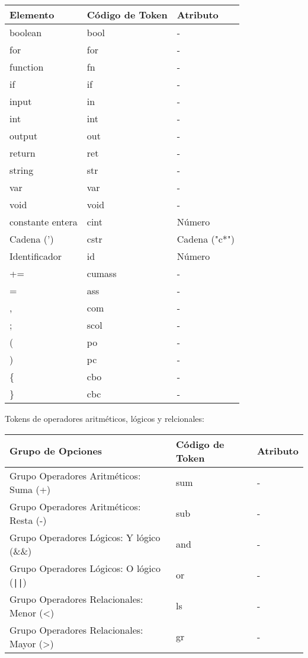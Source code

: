 \documentclass{article}
\begin{document}
\begin{table}[h!]
    \centering
    \begin{tabular}{|l|l|l|}
        \hline
        \textbf{Elemento} & \textbf{Código de Token} & \textbf{Atributo} \\ \hline
        boolean & bool & - \\ \hline
        for & for & - \\ \hline
        function & fn & - \\ \hline
        if & if & - \\ \hline
        input & in & - \\ \hline
        int & int & - \\ \hline
        output & out & - \\ \hline
        return & ret & - \\ \hline
        string & str & - \\ \hline
        var & var & - \\ \hline
        void & void & - \\ \hline
        constante entera & cint & Número \\ \hline
        Cadena (') & cstr & Cadena ("c*") \\ \hline
        Identificador & id & Número \\ \hline
        += & cumass & - \\ \hline
        = & ass & - \\ \hline
        , & com & - \\ \hline
        ; & scol & - \\ \hline
        ( & po & - \\ \hline
        ) & pc & - \\ \hline
        \{ & cbo & - \\ \hline
        \} & cbc & - \\ \hline
    \end{tabular}
\end{table}

Tokens de operadores aritméticos, lógicos y relcionales:
\begin{table}[h!]
    \centering
    \begin{tabular}{|l|l|l|}
        \hline
        \textbf{Grupo de Opciones} & \textbf{Código de Token} & \textbf{Atributo} \\ \hline
        Grupo Operadores Aritméticos: Suma (+) & sum & - \\ \hline
        Grupo Operadores Aritméticos: Resta (-) & sub & - \\ \hline
        Grupo Operadores Lógicos: Y lógico (\&\&) & and & - \\ \hline
        Grupo Operadores Lógicos: O lógico (\texttt{||}) & or & - \\ \hline
        Grupo Operadores Relacionales: Menor (<) & ls & - \\ \hline
        Grupo Operadores Relacionales: Mayor (>) & gr & - \\ \hline
    \end{tabular}
\end{table}
\end{document}
